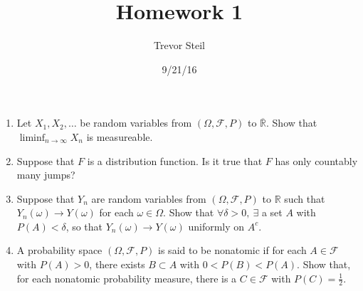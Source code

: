 \documentclass[a4paper]{article}
\title{Homework 1 }
\date{9/21/16}
\author{Trevor Steil}
\newcommand{\R}{\mathbb{R}}
\begin{document}
\maketitle

\begin{enumerate}
  \item
    Let $X_1, X_2, \dots $ be random variables from $( \Omega, \mathcal{F}, P )$ to $\overline{ \R }$. Show that $\liminf_{n \to \infty} X_n$ is measureable.

  \item
    Suppose that $F$ is a distribution function. Is it true that $F$ has only countably many jumps?

  \item
    Suppose that $Y_n$ are random variables from $( \Omega, \mathcal{F}, P )$ to $\R$ such that $Y_n(\omega) \to Y(\omega)$ for each $\omega \in \Omega$. Show that $\forall \delta > 0, \ \exists$ a set $A$ with $P(A) < \delta$, so that $Y_n(\omega) \to Y(\omega)$ uniformly on $A^c$.

  \item
    A probability space $ ( \Omega, \mathcal{F}, P )$ is said to be nonatomic if for each $A \in \mathcal{F}$ with $P(A) > 0$, there exists $B \subset A$ with $0 < P(B) < P(A)$. Show that, for each nonatomic probability measure, there is a $C \in \mathcal{F}$ with $P(C) = \frac{1}{2}$.

\end{enumerate}
\end{document}
